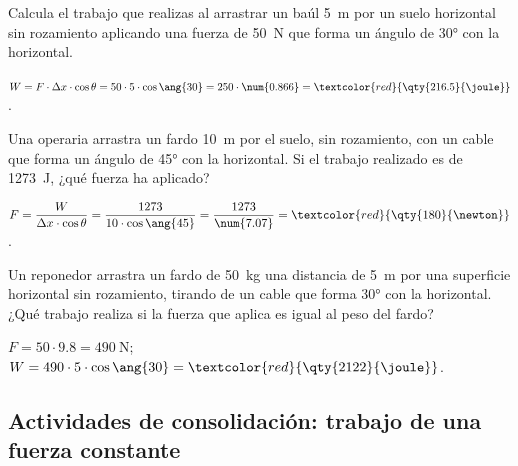 \begin{exercise}
    Calcula el trabajo que realizas al arrastrar un baúl \qty{5}{\m} por un suelo horizontal sin rozamiento aplicando una fuerza de \qty{50}{\newton} que forma un ángulo de \ang{30} con la horizontal.
    \begin{solu}
        \(W = F \cdot \Delta x \cdot \cos\theta = 50 \cdot 5 \cdot \cos\ang{30} = 250 \cdot \num{0.866} = \textcolor{red}{\qty{216.5}{\joule}}\).
    \end{solu}
\end{exercise}

\begin{exercise}
    Una operaria arrastra un fardo \qty{10}{\m} por el suelo, sin rozamiento, con un cable que forma un ángulo de \ang{45} con la horizontal. Si el trabajo realizado es de \qty{1273}{\joule}, ¿qué fuerza ha aplicado?
    \begin{solu}
        \(F = \dfrac{W}{\Delta x \cdot \cos\theta} = \dfrac{1273}{10 \cdot \cos\ang{45}} = \dfrac{1273}{\num{7.07}} = \textcolor{red}{\qty{180}{\newton}}\).
    \end{solu}
\end{exercise}

\begin{exercise}
    Un reponedor arrastra un fardo de \qty{50}{\kg} una distancia de \qty{5}{\m} por una superficie horizontal sin rozamiento, tirando de un cable que forma \ang{30} con la horizontal. ¿Qué trabajo realiza si la fuerza que aplica es igual al peso del fardo?
    \begin{solu}
        \(F = 50 \cdot \num{9.8} = \qty{490}{\newton}\); \(W = 490 \cdot 5 \cdot \cos\ang{30} = \textcolor{red}{\qty{2122}{\joule}}\).
    \end{solu}
\end{exercise}

\subsection*{Actividades de consolidación: trabajo de una fuerza constante}

